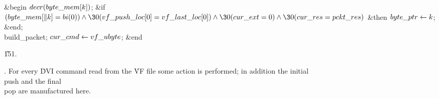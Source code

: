 \&{begin} $\\{decr}(\\{byte\_mem}[\|k])$;\6
\&{if} $(\\{byte\_mem}[\|k]=\\{bi}(0))\W\30(\\{vf\_push\_loc}[0]=\\{vf\_last%
\_loc}[0])\W\30(\\{cur\_ext}=0)\W\30(\\{cur\_res}=\\{pckt\_res})$ \1\&{then}\5
$\\{byte\_ptr}\K\|k$;\2\6
\&{end};\2\2\6
\\{build\_packet};\5
$\\{cur\_cmd}\K\\{vf\_ubyte}$;\6
\&{end}\par
\U151.\fi

. For every \.{DVI} command read from the \.{VF} file some action is
performed; in addition the initial \\{push} and the final \\{pop} are
manufactured here.

